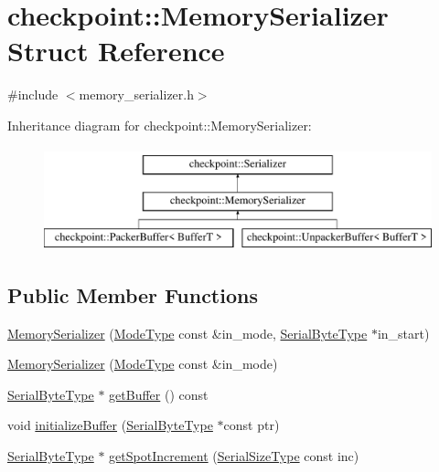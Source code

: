 \hypertarget{structcheckpoint_1_1_memory_serializer}{}\section{checkpoint\+:\+:Memory\+Serializer Struct Reference}
\label{structcheckpoint_1_1_memory_serializer}


{\ttfamily \#include $<$memory\+\_\+serializer.\+h$>$}

Inheritance diagram for checkpoint\+:\+:Memory\+Serializer\+:\begin{figure}[H]
\begin{center}
\leavevmode
\includegraphics[height=3.000000cm]{structcheckpoint_1_1_memory_serializer}
\end{center}
\end{figure}
\subsection*{Public Member Functions}
\begin{DoxyCompactItemize}
\item 
\hyperlink{structcheckpoint_1_1_memory_serializer_a9c748be7a41c032f2a33fbdc0dbd3611}{Memory\+Serializer} (\hyperlink{namespacecheckpoint_ae2509499ccd8b1dc48fb535bf8aa3059}{Mode\+Type} const \&in\+\_\+mode, \hyperlink{namespacecheckpoint_ae57f01cdc0b81776c23b6c7c934c58f5}{Serial\+Byte\+Type} $\ast$in\+\_\+start)
\item 
\hyperlink{structcheckpoint_1_1_memory_serializer_ae1532a75ce6849ad1f1ceb7a379e56da}{Memory\+Serializer} (\hyperlink{namespacecheckpoint_ae2509499ccd8b1dc48fb535bf8aa3059}{Mode\+Type} const \&in\+\_\+mode)
\item 
\hyperlink{namespacecheckpoint_ae57f01cdc0b81776c23b6c7c934c58f5}{Serial\+Byte\+Type} $\ast$ \hyperlink{structcheckpoint_1_1_memory_serializer_a075fce46e6d6bcfef43591cf26498d70}{get\+Buffer} () const
\item 
void \hyperlink{structcheckpoint_1_1_memory_serializer_a449eb24e2136febd621983d26e21a4ed}{initialize\+Buffer} (\hyperlink{namespacecheckpoint_ae57f01cdc0b81776c23b6c7c934c58f5}{Serial\+Byte\+Type} $\ast$const ptr)
\item 
\hyperlink{namespacecheckpoint_ae57f01cdc0b81776c23b6c7c934c58f5}{Serial\+Byte\+Type} $\ast$ \hyperlink{structcheckpoint_1_1_memory_serializer_a1c6b21009223b371ec79d679448f8319}{get\+Spot\+Increment} (\hyperlink{namespacecheckpoint_a083f6674da3f94c2901b18c6d238217c}{Serial\+Size\+Type} const inc)
\end{DoxyCompactItemize}
